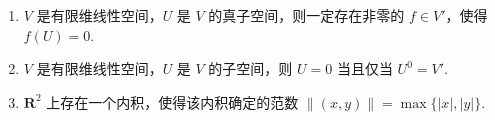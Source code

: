 \begin{enumerate}
\begin{enumerate}
        \item $V$ 是有限维线性空间，$U$ 是 $V$ 的真子空间，则一定存在非零的 $f \in V'$，使得 $f(U) = 0$.

        \item $V$ 是有限维线性空间，$U$ 是 $V$ 的子空间，则 $U = {0}$ 当且仅当 $U^{0} = V'$.

        \item $\mathbf{R}^{2}$ 上存在一个内积，使得该内积确定的范数 $\lVert(x, y)\rVert = \max \{|x|, |y|\}$.
    \end{enumerate}
\end{enumerate}

\clearpage
